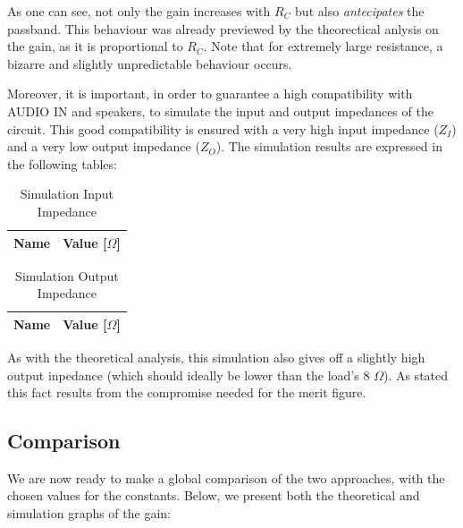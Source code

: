 As one can see, not only the gain increases with $R_C$ but also \textit{antecipates} the passband. This behaviour was already previewed by the theorectical anlysis on the gain, as it is proportional to $R_C$. Note that for extremely large resistance, a bizarre and slightly unpredictable behaviour occurs. 

Moreover, it is important, in order to guarantee a high compatibility with AUDIO IN and speakers, to simulate the input and output impedances of the circuit. This good compatibility is ensured with a very high input impedance ($Z_I$) and a very low output impedance ($Z_O$).  The simulation results are expressed in the following tables:

\begin{table}[h]
    \centering
    \begin{tabular}{|l|c|}
    \hline
    {\bf Name} & {\bf Value [$\Omega$]} \\ \hline
    
    \end{tabular}
    \caption{Simulation Input Impedance}
    \label{tab:simulation_input_imp}
\end{table}

\begin{table}[h]
    \centering
    \begin{tabular}{|l|c|}
    \hline
    {\bf Name} & {\bf Value [$\Omega$]} \\ \hline
    
    \end{tabular}
    \caption{Simulation Output Impedance}
    \label{tab:simulation_output_imp}
\end{table}

As with the theoretical analysis, this simulation also gives off a slightly high output inpedance (which should ideally be lower than the load's 8 $\Omega$). As stated this fact results from the compromise needed for the merit figure.
\pagebreak

\subsection{Comparison}
\label{subsec:comparison}

We are now ready to make a global comparison of the two approaches, with the chosen values for the constants. Below, we present both the theoretical and simulation graphs of the gain:

\vspace{-2.5cm}

